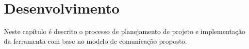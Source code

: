 \chapter{Desenvolvimento}

Neste capítulo é descrito o processo de planejamento de projeto e implementação da ferramenta com base no modelo de comunicação proposto.



